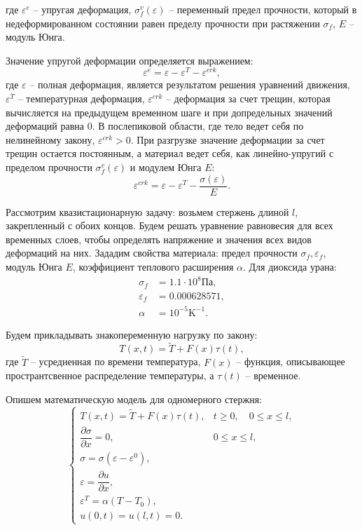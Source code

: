 \documentclass[12pt,a4paper]{article}
\begin{document}
  \noindent где $\varepsilon^e$ -- упругая деформация, $\sigma_f^v(\varepsilon)$ -- переменный предел прочности, который в недеформированном состоянии равен пределу прочности при растяжении $\sigma_f$, $E$ -- модуль Юнга.

  Значение упругой деформации определяется выражением:
  \[
    \varepsilon^e = \varepsilon - \varepsilon^T - \varepsilon^{crk},
  \]
  \noindent где 
  $\varepsilon$ -- полная деформация, является результатом решения уравнений движения, $\varepsilon^T$ -- температурная деформация, $\varepsilon^{crk}$ -- деформация за счет трещин, которая вычисляется на предыдущем временном шаге и при допредельных значений деформаций равна $0$. В послепиковой области, где тело ведет себя по нелинейному закону, $\varepsilon^{crk} > 0$. При разгрузке значение деформации за счет трещин остается постоянным, а материал ведет себя, как линейно-упругий с пределом прочности $\sigma_f^v(\varepsilon)$ и модулем Юнга $E\colon$
  \[
    \varepsilon^{crk} = \varepsilon - \varepsilon^T - \dfrac{\sigma(\varepsilon)}{E}.
  \] 

  Рассмотрим квазистационарную задачу: возьмем стержень длиной $l$, закрепленный с обоих концов. Будем решать уравнение равновесия для всех временных слоев, чтобы определять напряжение и значения всех видов деформаций на них. Зададим свойства материала: предел прочности $\sigma_f, \varepsilon_f$, модуль Юнга $E$, коэффициент теплового расширения $\alpha$. Для диоксида урана:
  \[
    \begin{split}
      \sigma_f &= 1.1 \cdot 10^8 \text{Па}, \\
      \varepsilon_f &= 0.000628571, \\
      \alpha &= 10^{-5} \text{K}^{-1}.
    \end{split}
  \]

  Будем прикладывать знакопеременную нагрузку по закону:
  \[
    T(x, t) = \widetilde{T} + F(x) \tau(t),
  \]
  \noindent где $\widetilde{T}$ -- усредненная по времени температура, $F(x)$ -- функция, описывающее пространтсвенное распределение температуры, а $\tau(t)$ -- временное.

  Опишем математическую модель для одномерного стержня:
  \begin{equation}
    \begin{cases}
      T(x, t) = \widetilde{T} + F(x) \tau(t), & t \geq 0, \quad 0 \leq x \leq l, \\[0.7em]
      \dfrac{\partial \sigma}{\partial x} = 0, & 0 \leq x \leq l, \\[0.7em]
      \sigma = \sigma(\varepsilon - \varepsilon^0), \\[0.7em]
      \varepsilon = \dfrac{\partial u}{\partial x}, \\[0.7em]
      \varepsilon^T = \alpha(T - T_0), \\[0.7em]
      u(0, t) = u(l, t) = 0.
    \end{cases}
    \label{model}
  \end{equation}
\end{document}
